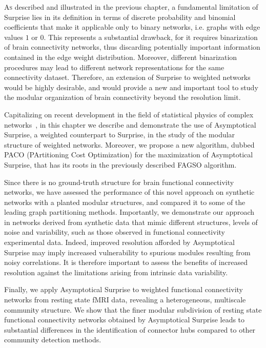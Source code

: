 \bigbreak
\lettrine{A}{s} described and illustrated in the previous chapter, a fundamental limitation of Surprise lies in its definition in terms of discrete probability and binomial coefficients that make it applicable only to binary networks, i.e. graphs with edge values $1$ or $0$.
This represents a substantial drawback, for it requires binarization of brain connectivity networks, thus discarding potentially important information contained in the edge weight distribution.
Moreover, different binarization procedures may lead to different network representations for the same connectivity dataset.
Therefore, an extension of Surprise to weighted networks would be highly desirable, and would provide a new and important tool to study the modular organization of brain connectivity beyond the resolution limit.

Capitalizing on recent development in the field of statistical physics of complex networks~\cite{traag2015}, in this chapter we describe and demonstrate the use of Asymptotical Surprise, a weighted counterpart to Surprise, in the study of the modular structure of weighted networks.
Moreover, we propose a new algorithm, dubbed PACO (PArtitioning Cost Optimization) for the maximization of Asymptotical Surprise, that has its roots in the previously described FAGSO algorithm.

Since there is no ground-truth structure for brain functional connectivity networks, we have assessed the performance of this novel approach on synthetic networks with a planted modular structures, and compared it to some of the leading graph partitioning methods.
Importantly, we demonstrate our approach in networks  derived from synthetic data that mimic different structures, levels of noise and variability, such as those observed in functional connectivity experimental data.
Indeed, improved resolution afforded by Asymptotical Surprise may imply increased vulnerability to spurious modules resulting from noisy correlations.
It is therefore important to assess the benefits of increased resolution against the limitations arising from intrinsic data variability. 

Finally, we apply Asymptotical Surprise to weighted functional connectivity networks from resting state fMRI data, revealing a heterogeneous, multiscale community structure. We show that the finer modular subdivision of resting state functional connectivity networks obtained by Asymptotical Surprise leads to substantial differences in the identification of connector hubs compared to other community detection methods.

